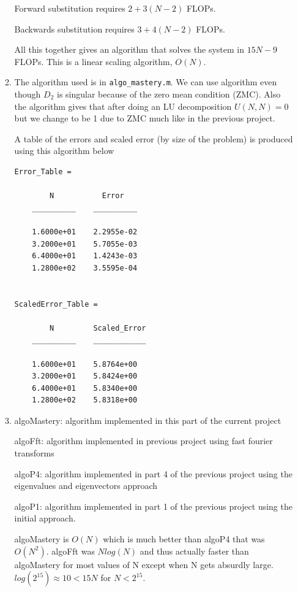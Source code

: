\documentclass{article}
\begin{document}
\begin{enumerate}
\begin{enumerate}
			Forward substitution requires $ 2 + 3(N-2)$ FLOPs. 
			
			Backwards substitution requires $3 + 4(N-2)$ FLOPs. 
			
			All this together gives an algorithm that solves the system in $15N - 9 $ FLOPs. This is a linear scaling algorithm, $O(N)$.
			
		\item The algorithm used is in \texttt{algo\_mastery.m}. We can use algorithm even though $D_2$ is singular because of the zero mean condition (ZMC). Also the algorithm gives that after doing an LU decomposition $U(N,N) = 0$ but we change to be 1 due to ZMC much like in the previous project. 
		
		A table of the errors and scaled error (by size of the problem) is produced using this algorithm below
		
		\begin{verbatim}
Error_Table = 

        N           Error   
    __________    __________

    1.6000e+01    2.2955e-02
    3.2000e+01    5.7055e-03
    6.4000e+01    1.4243e-03
    1.2800e+02    3.5595e-04


ScaledError_Table = 

        N         Scaled_Error
    __________    ____________

    1.6000e+01    5.8764e+00  
    3.2000e+01    5.8424e+00  
    6.4000e+01    5.8340e+00  
    1.2800e+02    5.8318e+00  
		\end{verbatim}
		
		\item 
		algoMastery: algorithm implemented in this part of the current project
		
		algoFft: algorithm implemented in previous project using fast fourier transforms
		
		algoP4: algorithm implemented in part 4 of the previous project using the eigenvalues and eigenvectors approach
		
		algoP1: algorithm implemented in part 1 of the previous project using the initial approach.
		 		
		algoMastery is $O(N)$ which is much better than algoP4 that was $O(N^2)$. algoFft was $ N log(N)$ and thus actually faster than algoMastery for most values of N except when N gets absurdly large. $log(2^{15}) \approx 10 < 15N$ for $N<2^{15}$. 
		

\end{enumerate}
\end{enumerate}
\end{document}
